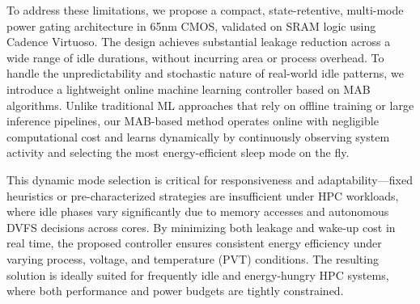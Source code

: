 \documentclass[conference]{IEEEtran}
\begin{document}
To address these limitations, we propose a compact, state-retentive, multi-mode power gating architecture in 65nm CMOS, validated on SRAM logic using Cadence Virtuoso. The design achieves substantial leakage reduction across a wide range of idle durations, without incurring area or process overhead. To handle the unpredictability and stochastic nature of real-world idle patterns, we introduce a lightweight online machine learning controller based on MAB algorithms. Unlike traditional ML approaches that rely on offline training or large inference pipelines, our MAB-based method operates online with negligible computational cost and learns dynamically by continuously observing system activity and selecting the most energy-efficient sleep mode on the fly.

This dynamic mode selection is critical for responsiveness and adaptability—fixed heuristics or pre-characterized strategies are insufficient under HPC workloads, where idle phases vary significantly due to memory accesses and autonomous DVFS decisions across cores. By minimizing both leakage and wake-up cost in real time, the proposed controller ensures consistent energy efficiency under varying process, voltage, and temperature (PVT) conditions. The resulting solution is ideally suited for frequently idle and energy-hungry HPC systems, where both performance and power budgets are tightly constrained.




\end{document}
